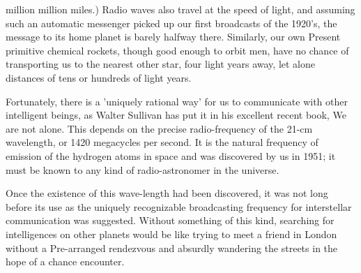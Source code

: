 \documentclass[kindlepaper]{BHCexam4kindle}
\begin{document}
million million miles.) Radio waves also travel at the speed of light, and assuming such an automatic
messenger picked up our first broadcasts of the 1920's, the message to its home planet is barely halfway there.
Similarly, our own Present primitive chemical rockets, though good enough to orbit men, have no chance of
transporting us to the nearest other star, four light years away, let alone distances of tens or hundreds of light
years.
\par
Fortunately, there is a 'uniquely rational way' for us to communicate with other intelligent beings, as
Walter Sullivan has put it in his excellent recent book, We are not alone. This depends on the precise
radio-frequency of the 21-cm wavelength, or 1420 megacycles per second. It is the natural frequency of
emission of the hydrogen atoms in space and was discovered by us in 1951; it must be known to any kind of
radio-astronomer in the universe.
\par
Once the existence of this wave-length had been discovered, it was not long before its use as the uniquely
recognizable broadcasting frequency for interstellar communication was suggested. Without something of this
kind, searching for intelligences on other planets would be like trying to meet a friend in London without a
Pre-arranged rendezvous and absurdly wandering the streets in the hope of a chance encounter.
\clearpage
\end{document}

